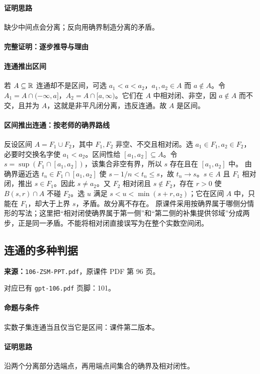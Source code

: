 \paragraph{证明思路}缺少中间点会分离；反向用确界制造分离的矛盾。
\paragraph{完整证明：逐步推导与理由}

\paragraph{连通推出区间}
若 $A\subseteq\mathbb{R}$ 连通却不是区间，可选 $a_1<a<a_2$，$a_1,a_2\in A$ 而 $a\notin A$。令 $A_1=A\cap(-\infty,a]$，$A_2=A\cap[a,\infty)$。它们在 $A$ 中相对闭、非空，因 $a\notin A$ 而不交，且并为 $A$，这就是非平凡闭分离，违反连通。故 $A$ 是区间。
\paragraph{区间推出连通：按老师的确界路线}
反设区间 $A=F_1\cup F_2$，其中 $F_1,F_2$ 非空、不交且相对闭。选 $a_1\in F_1,a_2\in F_2$，必要时交换名字使 $a_1<a_2$。区间性给 $[a_1,a_2]\subseteq A$。令 $s=\sup(F_1\cap[a_1,a_2])$，该集合非空有界，所以 $s$ 存在且在 $[a_1,a_2]$ 中。
由确界逼近选 $t_n\in F_1\cap[a_1,a_2]$ 使 $s-1/n<t_n\le s$，故 $t_n\to s$。$s\in A$ 且 $F_1$ 相对闭，推出 $s\in F_1$。因此 $s\ne a_2$。又 $F_2$ 相对闭且 $s\notin F_2$，存在 $r>0$ 使 $B(s,r)\cap A$ 不碰 $F_2$。选 $u$ 满足 $s<u<\min(s+r,a_2)$；它在区间 $A$ 中，只能在 $F_1$，却大于上界 $s$，矛盾。故分离不存在。
原课件采用按确界属于哪侧分情形的写法；这里把“相对闭使确界属于第一侧”和“第二侧的补集提供邻域”分成两步，正是同一矛盾。不能将相对闭直接误写为在整个实数空间闭。

\clearpage\subsection{连通的多种判据}
\textbf{来源：}\texttt{106-ZSM-PPT.pdf}，原课件 PDF 第 96 页。\par
对应已有 \texttt{gpt-106.pdf} 页脚：101。\par
\paragraph{命题与条件}实数子集连通当且仅当它是区间：课件第二版本。
\paragraph{证明思路}沿两个分离部分选端点，再用端点间集合的确界及相对闭性。
